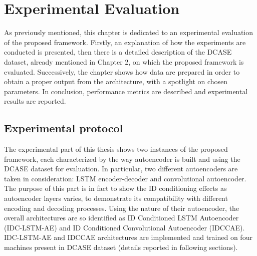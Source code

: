 \chapter{Experimental Evaluation}
As previously mentioned, this chapter is dedicated to an experimental evaluation of the proposed framework. Firstly, an explanation of how the experiments are conducted is presented, then there is a detailed description of the DCASE dataset, already mentioned in Chapter 2, on which the proposed framework is evaluated. Successively, the chapter shows how data are prepared in order to obtain a proper output from the architecture, with a spotlight on chosen parameters.
In conclusion, performance metrics are described and experimental results are reported.
\section{Experimental protocol}
The experimental part of this thesis shows two instances of the proposed framework, each characterized by the way autoencoder is built and using the DCASE dataset for evaluation. In particular, two different autoencoders are taken in consideration: LSTM encoder-decoder and convolutional autoencoder. The purpose of this part is in fact to show the ID conditioning effects as autoencoder layers varies, to demonstrate its compatibility with different encoding and decoding processes. Using the nature of their autoencoder, the overall architectures are so identified as ID Conditioned LSTM Autoencoder (IDC-LSTM-AE) and ID Conditioned Convolutional Autoencoder (IDCCAE). IDC-LSTM-AE and IDCCAE architectures are implemented and trained on four machines present in DCASE dataset (details reported in following sections).
